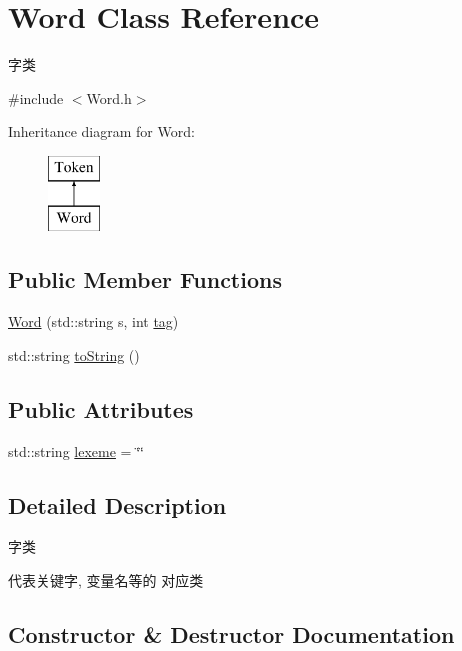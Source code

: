 \hypertarget{class_word}{}\section{Word Class Reference}
\label{class_word}


字类  




{\ttfamily \#include $<$Word.\+h$>$}

Inheritance diagram for Word\+:\begin{figure}[H]
\begin{center}
\leavevmode
\includegraphics[height=2.000000cm]{class_word}
\end{center}
\end{figure}
\subsection*{Public Member Functions}
\begin{DoxyCompactItemize}
\item 
\hyperlink{class_word_acb127ce0ab789dc0ecfc407dec786ac2}{Word} (std\+::string s, int \hyperlink{class_token_a2a4b0e1b648c2a9be1976004eb3c4ff0}{tag})
\item 
std\+::string \hyperlink{class_word_a950a81bfd0fc369b0eb8d0d6b27e2870}{to\+String} ()
\end{DoxyCompactItemize}
\subsection*{Public Attributes}
\begin{DoxyCompactItemize}
\item 
std\+::string \hyperlink{class_word_a34691d869ec57b2a0b7a8eb41230b92a}{lexeme} = \char`\"{}\char`\"{}
\end{DoxyCompactItemize}


\subsection{Detailed Description}
字类 

代表关键字, 变量名等的 对应类 

\subsection{Constructor \& Destructor Documentation}
\mbox{\label{class_word_acb127ce0ab789dc0ecfc407dec786ac2}} 

